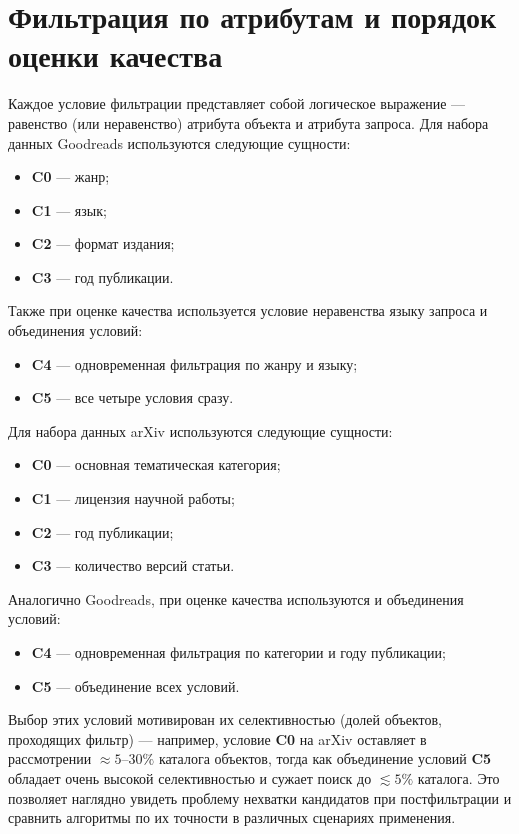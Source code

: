 \documentclass[14pt,a4paper]{extreport}
\numberwithin{figure}{chapter}
\numberwithin{table}{chapter}
\numberwithin{equation}{chapter}
\begin{document}
\section{Фильтрация по атрибутам и порядок оценки качества}
Каждое условие фильтрации представляет собой логическое выражение --- равенство (или неравенство) атрибута объекта и атрибута запроса. 
Для набора данных Goodreads используются следующие сущности:
\begin{itemize}
\item \textbf{C0} --- жанр;
\item \textbf{C1} --- язык;
\item \textbf{C2} --- формат издания;
\item \textbf{C3} --- год публикации.
\end{itemize}
Также при оценке качества используется условие неравенства языку запроса и объединения условий:
\begin{itemize}
\item \textbf{C4} --- одновременная фильтрация по жанру и языку;
\item \textbf{C5} --- все четыре условия сразу.
\end{itemize}
Для набора данных arXiv используются следующие сущности:
\begin{itemize}
\item \textbf{C0} --- основная тематическая категория;
\item \textbf{C1} --- лицензия научной работы;
\item \textbf{C2} --- год публикации;
\item \textbf{C3} --- количество версий статьи.
\end{itemize}
Аналогично Goodreads, при оценке качества используются и объединения условий:
\begin{itemize}
\item \textbf{C4} --- одновременная фильтрация по категории и году публикации;
\item \textbf{C5} --- объединение всех условий.
\end{itemize}

Выбор этих условий мотивирован их селективностью (долей объектов, проходящих фильтр) --- например, условие \textbf{C0} на arXiv оставляет в рассмотрении $\approx 5$--$30\%$ каталога объектов, тогда как объединение условий \textbf{C5} обладает очень высокой селективностью и сужает поиск до $\lesssim 5\%$ каталога. Это позволяет наглядно увидеть проблему нехватки кандидатов при постфильтрации и сравнить алгоритмы по их точности в различных сценариях применения. 
\end{document}
